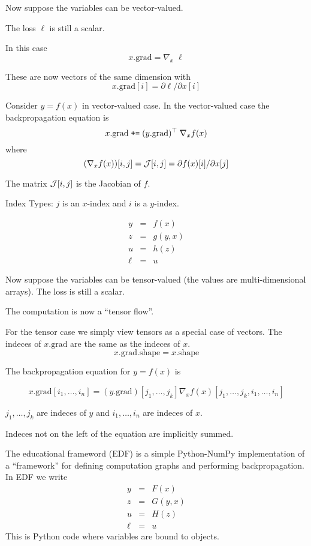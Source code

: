 {\vfill
Now suppose the variables can be  vector-valued.

\vfill
The loss $\ell$ is still a scalar.

\vfill
In this case
$$x.\mathrm{grad} = \nabla_x\;\ell$$

\vfill
These are now vectors of the same dimension with
$$x.\mathrm{grad}[i] = \partial \ell/\partial x[i]$$

Consider $y =f(x)$ in vector-valued case.
\vfill
In the vector-valued case the backpropagation equation is
\vfill
$$x.\mathrm{grad}\; \mbox{\tt +=}\; (y.\mathrm{grad})^\top\; \nabla_x f(x)$$
\vfill
where
$$(\nabla_x f(x))[i,j] = {\cal J}[i,j] = \partial f(x)[i] /\partial x[j]$$

\vfill
The matrix ${\cal J}[i,j]$ is the Jacobian of $f$.

\vfill
Index Types: $j$ is an $x$-index and $i$ is a $y$-index.


\begin{eqnarray*}
  y & = & f(x) \\
  z & = & g(y,x) \\
  u & = & h(z) \\
  \ell & = & u
\end{eqnarray*}

\vfill
Now suppose the variables can be  tensor-valued (the values are multi-dimensional arrays).  The loss is still a scalar.

\vfill
The computation is now a ``tensor flow''.

For the tensor case we simply view tensors as a special case of vectors.  The indeces of $x.\mathrm{grad}$ are the
same as the indeces of $x$.
$$x.\mathrm{grad}.\mathrm{shape} = x.\mathrm{shape}$$

\vfill
The backpropagation equation for $y = f(x)$ is

$$x.\mathrm{grad}[i_1,\ldots,i_n] = (y.\mathrm{grad})[j_1,\ldots,j_k] \nabla_x f(x)[j_1,\ldots,j_k,i_1,\ldots,i_n]$$

\vfill
$j_1,\ldots,j_k$ are indeces of $y$ and $i_1,\ldots,i_n$ are indeces of $x$.

\vfill
Indeces not on the left of the equation are implicitly summed.


The educational frameword (EDF) is a simple Python-NumPy implementation of a ``framework'' for defining computation graphs
and performing backpropagation. In EDF we write
\begin{eqnarray*}
  y & = & F(x) \\
  z & = & G(y,x) \\
  u & = & H(z) \\
  \ell &  = &  u
\end{eqnarray*}
\medskip
This is Python code where variables are bound to objects.

}
